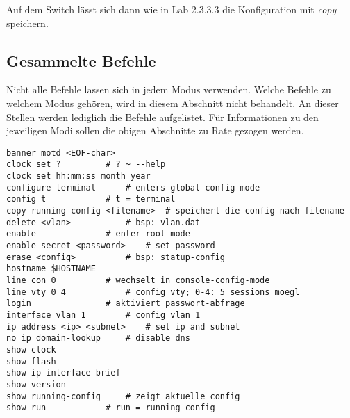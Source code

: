 \noindent Auf dem Switch lässt sich dann wie in Lab 2.3.3.3 die Konfiguration mit {\it copy} speichern.

\newpage
\subsection{Gesammelte Befehle}
Nicht alle Befehle lassen sich in jedem Modus verwenden. Welche Befehle zu welchem Modus gehören, wird in diesem Abschnitt nicht behandelt. An dieser Stellen werden lediglich die Befehle aufgelistet. Für Informationen zu den jeweiligen Modi sollen die obigen Abschnitte zu Rate gezogen werden.

\begin{lstlisting}
banner motd <EOF-char>
clock set ?			# ? ~ --help
clock set hh:mm:ss month year
configure terminal		# enters global config-mode
config t			# t = terminal
copy running-config <filename>	# speichert die config nach filename
delete <vlan>			# bsp: vlan.dat
enable				# enter root-mode
enable secret <password>	# set password
erase <config>			# bsp: statup-config	
hostname $HOSTNAME
line con 0			# wechselt in console-config-mode
line vty 0 4			# config vty; 0-4: 5 sessions moegl	
login				# aktiviert passwort-abfrage
interface vlan 1		# config vlan 1
ip address <ip> <subnet>	# set ip and subnet
no ip domain-lookup		# disable dns
show clock
show flash
show ip interface brief
show version
show running-config		# zeigt aktuelle config
show run			# run = running-config
\end{lstlisting}